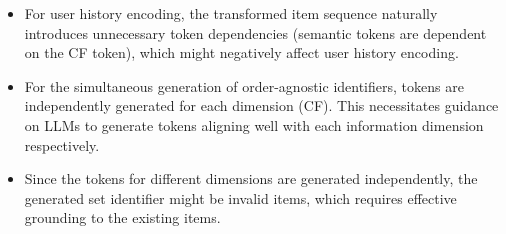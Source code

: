 \begin{itemize}[leftmargin=*]
    \item For user history encoding, the transformed item sequence naturally introduces unnecessary token dependencies (\eg semantic tokens are dependent on the CF token), which might negatively affect user history encoding. 
    \item For the simultaneous generation of order-agnostic identifiers, 
    tokens are independently generated for each dimension (\eg CF). 
    This necessitates guidance on LLMs to generate tokens aligning well with each information dimension respectively. 
    \item 
    Since the tokens for different dimensions are generated independently, 
    the generated set identifier might be invalid items, which requires effective grounding to the existing items. 
\end{itemize}

